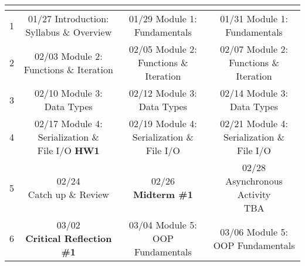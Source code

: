\documentclass[11pt]{article}
\begin{document}
\begin{tabular}{| r | c | c | c |}
	\hline
	\cellcolor{gray!40} \colorbox{gray!40}{\makecell{Week}} &
	\cellcolor{gray!40} \colorbox{gray!40}{\makecell{Monday}} &
	\cellcolor{gray!40} \colorbox{gray!40}{\makecell{Wednesday}} &
	\cellcolor{gray!40} \colorbox{gray!40}{\makecell{Friday}} \\
	\hline 1 & 
	\makecell{01/27 Introduction: \\Syllabus \& Overview} & 
	\makecell{01/29 Module 1: \\Fundamentals} & 
	\makecell{01/31 Module 1: \\Fundamentals} \\
	\hline 2 & 
	\makecell{02/03 Module 2: \\Functions \& Iteration} & 
	\makecell{02/05 Module 2: \\Functions \& Iteration} & 
	\makecell{02/07 Module 2: \\Functions \& Iteration} \\
	\hline 3 & 
	\makecell{02/10 Module 3: \\Data Types} & 
	\makecell{02/12 Module 3: \\Data Types} & 
	\makecell{02/14 Module 3: \\Data Types} \\
	\hline 4 & 
	\makecell{02/17 Module 4: \\Serialization \& \\File I/O  \textbf{HW1}} & 
	\makecell{02/19 Module 4: \\Serialization \& \\File I/O} &
	\makecell{02/21 Module 4: \\Serialization \& \\File I/O} \\
	\hline 5 &
	\makecell{02/24 \\ Catch up \& Review} &
	\makecell{02/26 \\ \textbf{Midterm \#1}} &
	\makecell{02/28 \\ Asynchronous Activity \\TBA} \\
	\hline 6 &
	\makecell{03/02 \\ \textbf{Critical Reflection \#1}} &
	\makecell{03/04 Module 5: \\OOP Fundamentals} &
	\makecell{03/06 Module 5: \\OOP Fundamentals} \\

\end{tabular}
\end{document}

